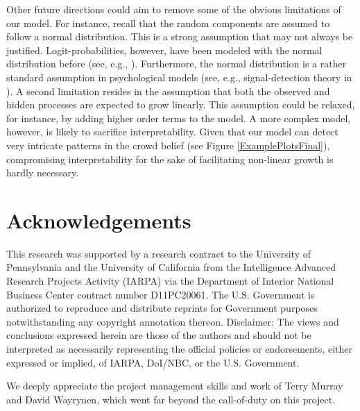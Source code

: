\documentclass[aoas, preprint]{imsart}
\numberwithin{equation}{section}
\theoremstyle{plain}
\begin{document}
Other future directions could aim to remove some of the obvious limitations of our model. For instance, recall that the random components are assumed to follow a normal distribution. This is a strong assumption that may not always be justified. Logit-probabilities, however, have been modeled with the normal distribution before (see, e.g., \citet{Erev1994}). Furthermore, the normal distribution is a rather standard assumption in psychological models (see, e.g.,  signal-detection theory  in \citet{tanner1954decision}). A second limitation resides in the assumption that both the observed and hidden processes are expected to grow linearly. This assumption could be relaxed, for instance, by adding higher order terms to the model. A more complex model, however, is likely to sacrifice interpretability. Given that our model can detect very intricate patterns in the crowd belief  (see Figure \ref{ExamplePlotsFinal}), compromising interpretability for the sake of facilitating non-linear growth is hardly necessary. 



\section{Acknowledgements}
\noindent
This research was supported by a research contract to the University
of Pennsylvania and the University of California from the Intelligence Advanced Research Projects Activity
(IARPA) via the Department of Interior National Business Center
contract number D11PC20061. The U.S. Government is authorized to reproduce and
distribute reprints for Government purposes notwithstanding any
copyright annotation thereon. Disclaimer: The views and conclusions
expressed herein are those of the authors and should not be
interpreted as necessarily representing the official policies or
endorsements, either expressed or implied, of IARPA, DoI/NBC, or the
U.S. Government. 

We deeply appreciate the project management
skills and work of Terry Murray and David Wayrynen, which went far
beyond the call-of-duty on this project.



\end{document}
